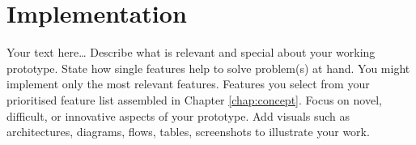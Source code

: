\chapter{Implementation}
\label{chap:implementation}
\chapterstart

Your text here\ldots
Describe what is relevant and special about your working prototype. State how single features help to solve problem(s) at hand. You might implement only the most relevant features. Features you select from your prioritised feature list assembled in Chapter \ref{chap:concept}. Focus on novel, difficult, or innovative aspects of your prototype. Add visuals such as architectures, diagrams, flows, tables, screenshots to illustrate your work.

\chapterend